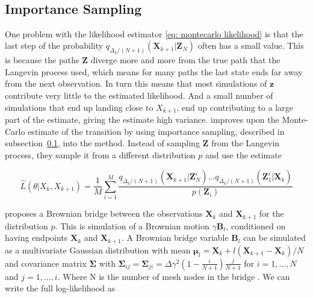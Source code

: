 \

\subsection{Importance Sampling}
\label{subsec: importance sampling}
One problem with the likelihood estimator \eqref{eq: montecarlo likelihood} is that the last step of the probability $q_{\Delta_k/(N+1)}(\textbf{X}_{k+1}|\textbf{Z}_N)$ often has a small value. This is because the paths $\textbf{Z}$ diverge more and more from the true path that the Langevin process used, which means for many paths  the last state ends far away from the next observation. In turn this means that most simulations of $\textbf{z}$ contribute very little to the estimated likelihood. And a small number of simulations that end up landing close to $X_{k+1}$, end up contributing to a large part of the estimate, giving the estimate high variance. \parencite{durham_numerical_2002} improves upon the Monte-Carlo estimate of the transition by using importance sampling, described in subsection~\ref{subsec: importance sampling}, into the method. Instead of sampling $\textbf{Z}$ from the Langevin process, they sample it from a different distribution $p$ and use the estimate

\begin{equation}
\hat{L}(\theta|X_k, X_{k+1}) = \frac{1}{M}\sum_{i=1}^M \frac{q_{\Delta_k/(N+1)}(\textbf{X}_{k+1}|\textbf{Z}^i_N)\dots q_{\Delta_k/(N+1)}(\textbf{Z}^i_1|\textbf{X}_k)}{p(\textbf{Z}_i)}
\label{eq: importance sampling likelihood}
\end{equation}


\parencite{durham_numerical_2002} proposes a Brownian bridge between the observations $\textbf{X}_k$ and $\textbf{X}_{k+1}$ for the distribution $p$. This is simulation of a Brownian motion $\gamma \textbf{B}_t$, conditioned on having endpoints $\textbf{X}_k$ and $\textbf{X}_{k+1}$. A Brownian bridge variable $\textbf{B}_l$ can be simulated as a multivariate Gaussian distribution with mean $\bm \mu_l = \textbf{X}_k + l(\textbf{X}_{k+1}-\textbf{X}_k)/N$ and covariance matrix $\bm \Sigma$ with $\bm \Sigma_{ij} = \bm \Sigma_{ji}= \Delta \gamma^2(1-\frac{i}{N+1}) \frac{j}{N+1}$ for $i = 1, \dots , N$ and $j = 1, \dots, i$. Where N is the number of mesh nodes in the bridge . We can write the full log-likelihood as 


